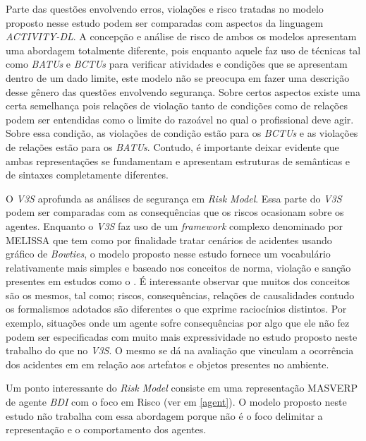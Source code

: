 Parte das questões envolvendo erros, violações e risco tratadas no modelo proposto nesse estudo podem ser comparadas com aspectos da linguagem \textit{ACTIVITY-DL}. A concepção e análise de risco de ambos os modelos apresentam uma abordagem totalmente diferente, pois enquanto aquele faz uso de técnicas tal como \textit{BATUs} e \textit{BCTUs} para verificar atividades e condições que se apresentam dentro de um dado limite, este modelo não se preocupa em fazer uma descrição desse gênero das questões envolvendo segurança. Sobre certos aspectos existe uma certa semelhança pois relações de violação tanto de condições como de relações podem ser entendidas como o limite do razoável no qual o profissional deve agir. Sobre essa condição, as violações de condição estão para os \textit{BCTUs} e as violações de relações estão para os \textit{BATUs}. Contudo, é importante deixar evidente que ambas representações se fundamentam e apresentam estruturas de semânticas e de sintaxes completamente diferentes. 

O \textit{V3S} aprofunda as análises de segurança em \textit{Risk Model}. Essa parte do \textit{V3S} podem ser comparadas com as consequências que os riscos ocasionam sobre os agentes. Enquanto 
o \textit{V3S} faz uso de um \textit{framework} complexo denominado por MELISSA que tem como por finalidade tratar cenários de acidentes usando gráfico de \textit{Bowties}, o modelo proposto nesse estudo fornece um vocabulário relativamente mais simples e baseado nos conceitos de norma, violação e sanção presentes em estudos como o \cite{dastaniframework}. É interessante observar que muitos dos conceitos são os mesmos, tal como; riscos, consequências, relações de causalidades contudo os formalismos adotados são diferentes o que exprime raciocínios distintos. Por exemplo, situações onde um agente sofre consequências por algo que ele não fez podem ser especificadas com muito mais expressividade no estudo proposto neste trabalho do que no \textit{V3S}. O mesmo se dá na avaliação que vinculam a ocorrência dos acidentes em em relação aos artefatos e objetos presentes no ambiente. 

Um ponto interessante do \textit{Risk Model} consiste em uma representação MASVERP  de agente \textit{BDI} com o foco em Risco (ver em \ref{agent}). O modelo proposto neste estudo não trabalha com essa abordagem porque não é o foco delimitar a representação e o comportamento dos agentes.

